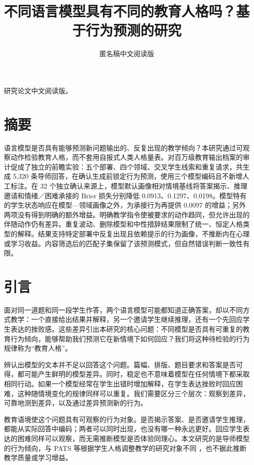 \documentclass[11pt,a4paper,UTF8]{ctexart}
\title{不同语言模型具有不同的教育人格吗？基于行为预测的研究}
\author{匿名稿中文阅读版}\date{}
\begin{document}
\maketitle

研究论文中文阅读版。

\section{摘要}

语言模型是否具有能够预测新问题输出的、反复出现的教学倾向？本研究通过可观察动作检验教育人格，而不套用自报式人类人格量表。对百万级教育输出档案的审计促成了独立的前瞻实验：五个部署、四个领域、交叉学生线索和重复请求，共生成 5,320 条导师回答，在确认生成前锁定行为预测，使用三个模型编码且不新增人工标注。在 32 个独立确认来源上，模型默认画像相对情境基线将答案揭示、推理邀请和情绪／困难承接的 Brier 损失分别降低 0.0913、0.1297、0.0198。模型特有的学生状态响应在模型—领域画像之外，为承接行为再提供 0.0097 的增益；另外两项没有得到明确的额外增益。明确教学指令使被要求的动作趋同，但允许出现的伴随动作仍有差异。重复波动、删除模型和中性措辞结果限制了统一、恒定人格类型的解释。结果支持特定部署中反复出现且依赖提示的行为画像，不推断内在心理或学习收益。内容筛选后的匹配子集保留了该预测模式，但自然错误判断一致性有限。

\section{引言}

面对同一道题和同一段学生作答，两个语言模型可能都知道正确答案，却以不同方式教学：一个直接给出结果并解释，另一个邀请学生继续推理，还有一个先回应学生表达的挫败感。这些差异引出本研究的核心问题：不同模型是否具有可重复的教育行为倾向，能够帮助我们预测它在新情境下如何回应？我们将这种待检验的行为规律称为“教育人格”。

辨认出模型的文本并不足以回答这个问题。篇幅、排版、题目要求和答案是否可得，都可能产生鲜明的模型差异。同时，稳定也不意味着模型在任何情境下都采取相同行动。如果一个模型经常在学生出错时增加解释，在学生表达挫败时回应困难，这种随情境变化的规律同样可以重复。我们需要区分三个层次：观察到差异，可靠地测到差异，以及通过差异预测新的行为。

教育语境使这个问题具有可观察的行为对象。是否揭示答案、是否邀请学生推理，都能从实际回答中编码；两者可以同时出现，也没有哪一种永远更好。回应学生表达的困难同样可以观察，而无需推断模型是否体验同理心。本文研究的是导师模型的行为倾向，与 PATS 等根据学生人格调整教学的研究对象不同 \citep{rooein2026pats}，也不据此推断教学质量或学习增益。
\end{document}
